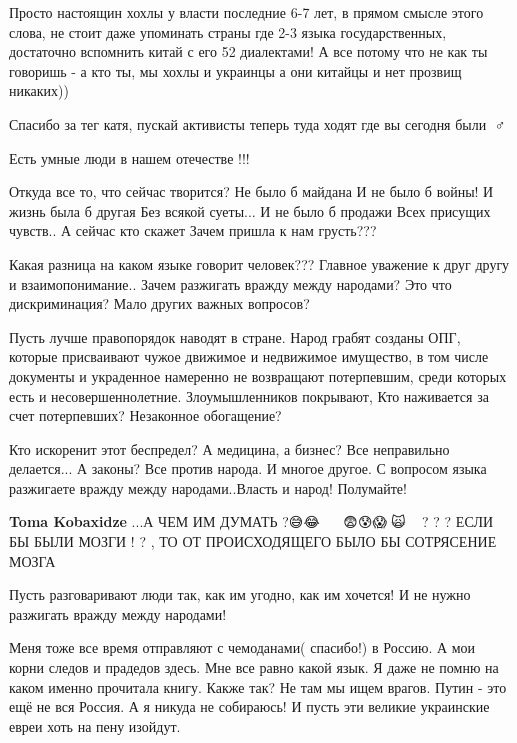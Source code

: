 \begin{itemize}
Просто настоящин хохлы у власти последние 6-7 лет, в прямом смысле этого слова,
не стоит даже упоминать страны где 2-3 языка государственных, достаточно
вспомнить китай с его 52 диалектами! А все потому что не как ты говоришь - а
кто ты, мы хохлы и украинцы а они китайцы и нет прозвищ никаких))

Спасибо за тег катя, пускай активисты теперь туда ходят где вы сегодня были 🤦♂️

Есть умные люди в нашем отечестве !!!

\obeycr
	Откуда все то, что сейчас творится?
	Не было б майдана
	И не было б войны!
	И жизнь была б другая
	Без всякой суеты...
	И не было б продажи
	Всех присущих чувств..
	А сейчас кто скажет
	Зачем пришла к нам грусть???
\restorecr


Какая разница на каком языке говорит человек??? Главное уважение к друг другу и
взаимопонимание.. Зачем разжигать вражду между народами? Это что дискриминация?
Мало других важных вопросов?

Пусть лучше правопорядок наводят в стране. Народ грабят созданы ОПГ, которые
присваивают чужое движимое и недвижимое имущество, в том числе документы и
украденное намеренно не возвращают потерпевшим, среди которых есть и
несовершеннолетние. Злоумышленников покрывают, Кто наживается за счет
потерпевших? Незаконное обогащение?

Кто искоренит этот беспредел? А медицина, а бизнес? Все неправильно делается...
А законы? Все против народа. И многое другое. С вопросом языка разжигаете
вражду между народами..Власть и народ! Полумайте!

\textbf{Toma Kobaxidze} ...А ЧЕМ ИМ ДУМАТЬ ?😅😂🤣🥵🥶🥸🧐🤯😨😰😱🤡🙀🙊🙉🙈 ? ? ?
ЕСЛИ БЫ БЫЛИ МОЗГИ ! ? , ТО ОТ ПРОИСХОДЯЩЕГО
БЫЛО БЫ СОТРЯСЕНИЕ МОЗГА


Пусть разговаривают люди так, как им угодно, как им хочется!  И не нужно
разжигать вражду между народами!


Меня тоже все время отправляют с чемоданами( спасибо!) в Россию. А мои корни
следов и прадедов здесь. Мне все равно какой язык. Я даже не помню на каком
именно прочитала книгу. Какже так? Не там мы ищем врагов. Путин - это ещё не
вся Россия. А я никуда не собираюсь! И пусть эти великие украинские евреи хоть
на пену изойдут.


\end{itemize}
